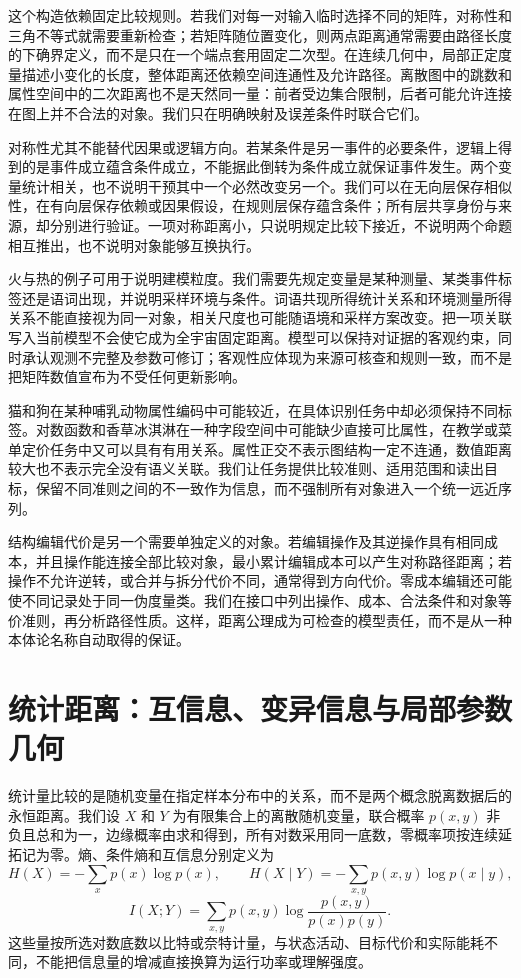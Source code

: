 这个构造依赖固定比较规则。若我们对每一对输入临时选择不同的矩阵，对称性和三角不等式就需要重新检查；若矩阵随位置变化，则两点距离通常需要由路径长度的下确界定义，而不是只在一个端点套用固定二次型。在连续几何中，局部正定度量描述小变化的长度，整体距离还依赖空间连通性及允许路径。离散图中的跳数和属性空间中的二次距离也不是天然同一量：前者受边集合限制，后者可能允许连接在图上并不合法的对象。我们只在明确映射及误差条件时联合它们。

对称性尤其不能替代因果或逻辑方向。若某条件是另一事件的必要条件，逻辑上得到的是事件成立蕴含条件成立，不能据此倒转为条件成立就保证事件发生。两个变量统计相关，也不说明干预其中一个必然改变另一个。我们可以在无向层保存相似性，在有向层保存依赖或因果假设，在规则层保存蕴含条件；所有层共享身份与来源，却分别进行验证。一项对称距离小，只说明规定比较下接近，不说明两个命题相互推出，也不说明对象能够互换执行。

火与热的例子可用于说明建模粒度。我们需要先规定变量是某种测量、某类事件标签还是语词出现，并说明采样环境与条件。词语共现所得统计关系和环境测量所得关系不能直接视为同一对象，相关尺度也可能随语境和采样方案改变。把一项关联写入当前模型不会使它成为全宇宙固定距离。模型可以保持对证据的客观约束，同时承认观测不完整及参数可修订；客观性应体现为来源可核查和规则一致，而不是把矩阵数值宣布为不受任何更新影响。

猫和狗在某种哺乳动物属性编码中可能较近，在具体识别任务中却必须保持不同标签。对数函数和香草冰淇淋在一种字段空间中可能缺少直接可比属性，在教学或菜单定价任务中又可以具有有用关系。属性正交不表示图结构一定不连通，数值距离较大也不表示完全没有语义关联。我们让任务提供比较准则、适用范围和读出目标，保留不同准则之间的不一致作为信息，而不强制所有对象进入一个统一远近序列。

结构编辑代价是另一个需要单独定义的对象。若编辑操作及其逆操作具有相同成本，并且操作能连接全部比较对象，最小累计编辑成本可以产生对称路径距离；若操作不允许逆转，或合并与拆分代价不同，通常得到方向代价。零成本编辑还可能使不同记录处于同一伪度量类。我们在接口中列出操作、成本、合法条件和对象等价准则，再分析路径性质。这样，距离公理成为可检查的模型责任，而不是从一种本体论名称自动取得的保证。

\section{统计距离：互信息、变异信息与局部参数几何}
\label{sec:info_derivation_of_metric}

统计量比较的是随机变量在指定样本分布中的关系，而不是两个概念脱离数据后的永恒距离。我们设 $X$ 和 $Y$ 为有限集合上的离散随机变量，联合概率 $p(x,y)$ 非负且总和为一，边缘概率由求和得到，所有对数采用同一底数，零概率项按连续延拓记为零。熵、条件熵和互信息分别定义为
\[
H(X)=-\sum_xp(x)\log p(x),\qquad H(X\mid Y)=-\sum_{x,y}p(x,y)\log p(x\mid y),
\]
\[
I(X;Y)=\sum_{x,y}p(x,y)\log\frac{p(x,y)}{p(x)p(y)}.
\]
这些量按所选对数底数以比特或奈特计量，与状态活动、目标代价和实际能耗不同，不能把信息量的增减直接换算为运行功率或理解强度。

